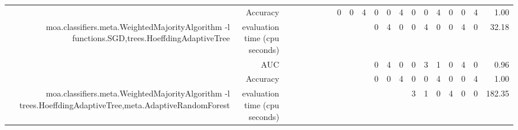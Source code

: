 \documentclass{article}
\providecommand{\tabularnewline}{\\}
\begin{document}
\begin{sidewaystable}
\begin{tabular}{|r|r|rrrrrr|r|r|r|r|r|r|r|r|r|r|r|r|r|}
 \cline{2-2} \cline{9-21}
 & Accuracy & \multicolumn{1}{r}{} & \multicolumn{1}{r}{} & \multicolumn{1}{r}{} & \multicolumn{1}{r}{} & \multicolumn{1}{r}{} & \multicolumn{1}{r|}{} & \multicolumn{1}{r|}{0} & \multicolumn{1}{r|}{0} & \multicolumn{1}{r|}{4} & \multicolumn{1}{r|}{0} & \multicolumn{1}{r|}{0} & \multicolumn{1}{r|}{4} & \multicolumn{1}{r|}{0} & \multicolumn{1}{r|}{0} & \multicolumn{1}{r|}{4} & \multicolumn{1}{r|}{0} & \multicolumn{1}{r|}{0} & \multicolumn{1}{r|}{4} & 1.00\tabularnewline
 \cline{1-2} \cline{9-21}
\multirow{3}{*}{moa.classifiers.meta.WeightedMajorityAlgorithm -l functions.SGD,trees.HoeffdingAdaptiveTree} & evaluation time (cpu seconds) & \multicolumn{1}{r}{} & \multicolumn{1}{r}{} & \multicolumn{1}{r}{} & \multicolumn{1}{r}{} & \multicolumn{1}{r}{} & \multicolumn{1}{r}{} & \multicolumn{1}{r}{} & \multicolumn{1}{r}{} & \multicolumn{1}{r|}{} & \multicolumn{1}{r|}{0} & \multicolumn{1}{r|}{4} & \multicolumn{1}{r|}{0} & \multicolumn{1}{r|}{0} & \multicolumn{1}{r|}{4} & \multicolumn{1}{r|}{0} & \multicolumn{1}{r|}{0} & \multicolumn{1}{r|}{4} & \multicolumn{1}{r|}{0} & 32.18\tabularnewline
 \cline{2-2} \cline{12-21}
 & AUC & \multicolumn{1}{r}{} & \multicolumn{1}{r}{} & \multicolumn{1}{r}{} & \multicolumn{1}{r}{} & \multicolumn{1}{r}{} & \multicolumn{1}{r}{} & \multicolumn{1}{r}{} & \multicolumn{1}{r}{} & \multicolumn{1}{r|}{} & \multicolumn{1}{r|}{0} & \multicolumn{1}{r|}{4} & \multicolumn{1}{r|}{0} & \multicolumn{1}{r|}{0} & \multicolumn{1}{r|}{3} & \multicolumn{1}{r|}{1} & \multicolumn{1}{r|}{0} & \multicolumn{1}{r|}{4} & \multicolumn{1}{r|}{0} & 0.96\tabularnewline
 \cline{2-2} \cline{12-21}
 & Accuracy & \multicolumn{1}{r}{} & \multicolumn{1}{r}{} & \multicolumn{1}{r}{} & \multicolumn{1}{r}{} & \multicolumn{1}{r}{} & \multicolumn{1}{r}{} & \multicolumn{1}{r}{} & \multicolumn{1}{r}{} & \multicolumn{1}{r|}{} & \multicolumn{1}{r|}{0} & \multicolumn{1}{r|}{0} & \multicolumn{1}{r|}{4} & \multicolumn{1}{r|}{0} & \multicolumn{1}{r|}{0} & \multicolumn{1}{r|}{4} & \multicolumn{1}{r|}{0} & \multicolumn{1}{r|}{0} & \multicolumn{1}{r|}{4} & 1.00\tabularnewline
 \cline{1-2} \cline{12-21}
\multirow{3}{*}{moa.classifiers.meta.WeightedMajorityAlgorithm -l trees.HoeffdingAdaptiveTree,meta.AdaptiveRandomForest} & evaluation time (cpu seconds) & \multicolumn{1}{r}{} & \multicolumn{1}{r}{} & \multicolumn{1}{r}{} & \multicolumn{1}{r}{} & \multicolumn{1}{r}{} & \multicolumn{1}{r}{} & \multicolumn{1}{r}{} & \multicolumn{1}{r}{} & \multicolumn{1}{r}{} & \multicolumn{1}{r}{} & \multicolumn{1}{r}{} & \multicolumn{1}{r|}{} & \multicolumn{1}{r|}{3} & \multicolumn{1}{r|}{1} & \multicolumn{1}{r|}{0} & \multicolumn{1}{r|}{4} & \multicolumn{1}{r|}{0} & \multicolumn{1}{r|}{0} & 182.35\tabularnewline

\end{tabular}
\end{sidewaystable}
\end{document}
